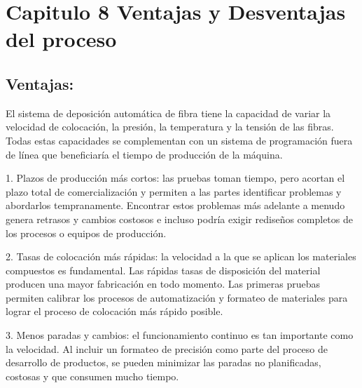 \chapter{Capitulo 8 Ventajas y Desventajas del proceso}
\label{capitulo 3}


\section{ \textbf{Ventajas}: }
El sistema de deposición automática de fibra tiene la capacidad de variar la velocidad de colocación, la presión, la temperatura y la tensión de las fibras. Todas estas capacidades se complementan con un sistema de programación fuera de línea que beneficiaría el tiempo de producción de la máquina. 
\item 1. Plazos de producción más cortos: las pruebas toman tiempo, pero acortan el plazo total de comercialización y permiten a las partes identificar problemas y abordarlos tempranamente. Encontrar estos problemas más adelante a menudo genera retrasos y cambios costosos e incluso podría exigir rediseños completos de los procesos o equipos de producción.

\item2. Tasas de colocación más rápidas: la velocidad a la que se aplican los materiales compuestos es fundamental. Las rápidas tasas de disposición del material producen una mayor fabricación en todo momento. Las primeras pruebas permiten calibrar los procesos de automatización y formateo de materiales para lograr el proceso de colocación más rápido posible.

\item 3. Menos paradas y cambios: el funcionamiento continuo es tan importante como la velocidad. Al incluir un formateo de precisión como parte del proceso de desarrollo de productos, se pueden minimizar las paradas no planificadas, costosas y que consumen mucho tiempo.

